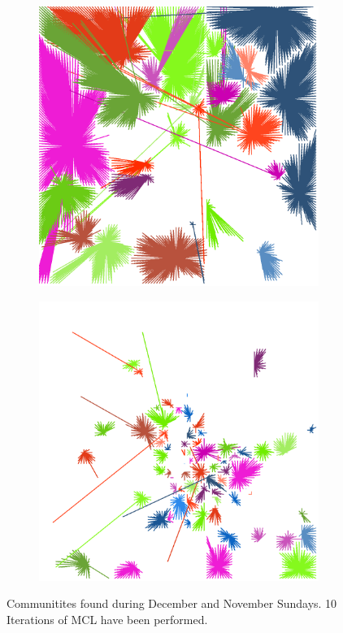 \documentclass[12pt,a4paper]{article}
\begin{document}
\begin{figure}[H]
\begin{subfigure}[b]{0.3\textwidth}
\end{subfigure}
\begin{subfigure}[b]{0.3\textwidth}
\includegraphics[width=\textwidth]{weekDef/edges-7Sun-mid.png}
\end{subfigure}
\begin{subfigure}[b]{0.3\textwidth}
\includegraphics[width=\textwidth]{weekDef/edges-7Sun-small.png}
\end{subfigure}
\caption{Communitites found during December and November Sundays. 10 Iterations of MCL have been performed.}
\label{fig:sunday}
\end{figure}
\end{document}
